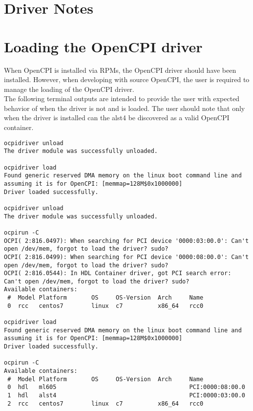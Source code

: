 \documentclass{article}
\begin{document}


\section{Driver Notes}


\section{Loading the OpenCPI driver}
When OpenCPI is installed via RPMs, the OpenCPI driver should have been installed. However, when developing with source OpenCPI, the user is required to manage the loading of the OpenCPI driver. \\
The following terminal outputs are intended to provide the user with expected behavior of when the driver is not and is loaded. The user should note that only when the driver is installed can the alst4 be discovered as a valid OpenCPI container.

\begin{lstlisting}
ocpidriver unload
The driver module was successfully unloaded.

ocpidriver load
Found generic reserved DMA memory on the linux boot command line and assuming it is for OpenCPI: [memmap=128M$0x1000000]
Driver loaded successfully.

ocpidriver unload
The driver module was successfully unloaded.

ocpirun -C
OCPI( 2:816.0497): When searching for PCI device '0000:03:00.0': Can't open /dev/mem, forgot to load the driver? sudo?
OCPI( 2:816.0499): When searching for PCI device '0000:08:00.0': Can't open /dev/mem, forgot to load the driver? sudo?
OCPI( 2:816.0544): In HDL Container driver, got PCI search error: Can't open /dev/mem, forgot to load the driver? sudo?
Available containers:
 #  Model Platform       OS     OS-Version  Arch     Name
 0  rcc   centos7        linux  c7          x86_64   rcc0
 
ocpidriver load
Found generic reserved DMA memory on the linux boot command line and assuming it is for OpenCPI: [memmap=128M$0x1000000]
Driver loaded successfully.

ocpirun -C
Available containers:
 #  Model Platform       OS     OS-Version  Arch     Name
 0  hdl   ml605                                      PCI:0000:08:00.0
 1  hdl   alst4                                      PCI:0000:03:00.0
 2  rcc   centos7        linux  c7          x86_64   rcc0
\end{lstlisting}
\end{document}
